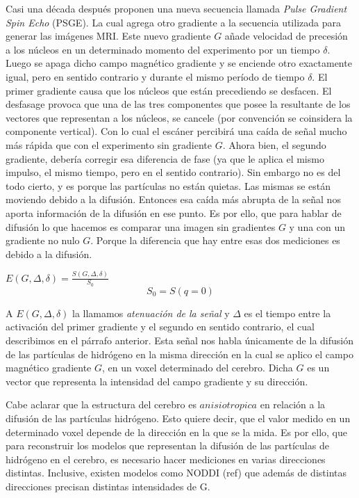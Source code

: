 \documentclass[11pt,a4paper,twoside]{tesis}
\begin{document}
Casi una d\'ecada despu\'es \citet{Stejskal1965} proponen una nueva secuencia 
llamada \textit{Pulse Gradient Spin Echo} (PSGE). La cual agrega otro
gradiente a la secuencia utilizada para generar las imágenes MRI. Este nuevo 
gradiente $G$ a\~nade velocidad de precesi\'on a los n\'ucleos en un 
determinado momento del experimento por un tiempo $\delta$. Luego se apaga dicho 
campo magn\'etico gradiente y se enciende otro exactamente igual, pero en 
sentido contrario y durante el mismo per\'iodo de tiempo $\delta$. El primer 
gradiente causa que los n\'ucleos que est\'an precediendo se desfacen. 
El desfasage provoca que una de las tres componentes que posee la resultante de los vectores que 
representan a los n\'ucleos, se cancele (por convenci\'on se coinsidera la componente vertical). Con 
lo cual el escáner percibir\'a una ca\'ida de se\~nal mucho m\'as r\'apida que con el experimento 
sin gradiente $G$. Ahora bien, el segundo gradiente, debería  corregir esa diferencia de fase (ya 
que le aplica el mismo impulso, el mismo tiempo, pero en el sentido contrario). Sin embargo no es 
del todo cierto, y es porque las part\'iculas no est\'an quietas. Las mismas se est\'an moviendo 
debido a la difusi\'on. Entonces esa caída más abrupta de la señal nos 
aporta informaci\'on de la difusión en ese punto. Es por ello, que para 
hablar de difusi\'on lo que hacemos es comparar una 
imagen sin gradientes $G$ y una con un gradiente no nulo $G$. Porque la 
diferencia que hay entre 
esas dos mediciones es debido a la difusi\'on.


\begin{center}
$E(G, \Delta, \delta) = \frac{S(G, \Delta, \delta)}{S_0}$ 
$$S_0=S(q=0)$$
\end{center}

A $E(G, \Delta, \delta)$ la llamamos \textit{atenuaci\'on de la señal} y 
$\Delta$ es el tiempo entre la activación del primer gradiente y el segundo en 
sentido contrario, el cual describimos en el párrafo anterior. Esta señal nos 
habla 
\'unicamente de la difusi\'on de las part\'iculas de hidr\'ogeno en la misma 
direcci\'on en la cual 
se aplico el campo magn\'etico gradiente $G$, en un voxel determinado del 
cerebro. Dicha $G$ es un vector que representa la intensidad 
del campo gradiente y su direcci\'on.

Cabe aclarar que la estructura del cerebro es $anisiotropica$ en relación 
a la difusión de las part\'iculas hidrógeno. Esto quiere decir, que el valor 
medido en un determinado voxel depende de la direcci\'on en la que se la mida. 
Es por ello, que para reconstruir los modelos que 
representan la difusi\'on de las partículas de hidrógeno en el cerebro, es 
necesario hacer mediciones en varias direcciones distintas. Inclusive, existen 
modelos como NODDI (ref) que adem\'as de distintas direcciones precisan 
distintas intensidades de G. 
\end{document}
